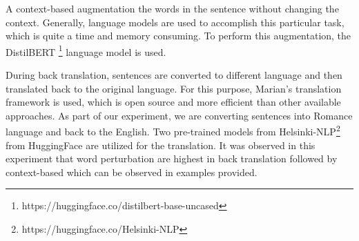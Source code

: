 \documentclass[%
	BCOR=8mm, %
	DIV=12,
	toc=bibliography, %
	toc=listof, %
	oneside, %
	egregdoesnotlikesansseriftitles, %
	]{scrbook}
\begin{document}
A context-based augmentation the words in the sentence without changing the context. Generally, language models are used to accomplish this particular task, which is quite a time and memory consuming. To perform this augmentation, the DistilBERT \footnote{https://huggingface.co/distilbert-base-uncased} language model is used.
\begin{table}[H]
    \centering
    \hspace*{-1.2em}
    \caption[Sample example of context-based augmentation]{ Sample example of context-based augmentation from IMDB dataset. }
    \label{table:conaugment}
\end{table}
During back translation, sentences are converted to different language and then translated back to the original language. For this purpose, Marian's translation framework \cite{ma_nlpaug_2022}  is used, which is open source and more efficient than other available approaches. As part of our experiment, we are converting sentences into Romance language and back to the English. Two pre-trained models  from Helsinki-NLP\footnote{https://huggingface.co/Helsinki-NLP}  from HuggingFace are utilized for the translation. It was observed in this experiment that word perturbation are highest in back translation followed by context-based which can be observed in examples provided.
\end{document}
